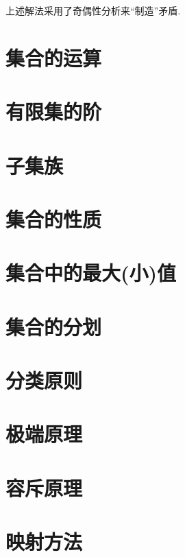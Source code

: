 \begin{note}
上述解法采用了奇偶性分析来“制造”矛盾.
\end{note}

\section{集合的运算}
\section{有限集的阶}
\section{子集族}
\section{集合的性质}
\section{集合中的最大(小)值}
\section{集合的分划}
\section{分类原则}
\section{极端原理}
\section{ 容斥原理}
\section{ 映射方法}